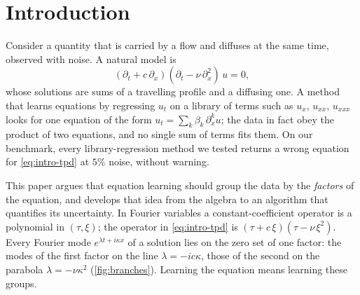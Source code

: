 \documentclass[11pt]{article}
\theoremstyle{plain}
\theoremstyle{definition}
\theoremstyle{remark}
\begin{document}
\section{Introduction}\label{sec:intro}
Consider a quantity that is carried by a flow and diffuses at the same time, observed with noise. A natural model is
\begin{equation}\label{eq:intro-tpd}
  (\partial_t+c\,\partial_x)(\partial_t-\nu\,\partial_x^2)\,u=0,
\end{equation}
whose solutions are sums of a travelling profile and a diffusing one. A method that learns equations by regressing
$u_t$ on a library of terms such as $u_x$, $u_{xx}$, $u_{xxx}$ looks for one equation of the form $u_t=\sum_k\beta_k\,\partial_x^ku$; the
data in fact obey the product of two equations, and no single sum of terms fits them. On our benchmark, every
library-regression method we tested returns a wrong equation for \eqref{eq:intro-tpd} at $5\%$ noise, without warning.

This paper argues that equation learning should group the data by the \emph{factors} of the equation, and develops that
idea from the algebra to an algorithm that quantifies its uncertainty. In Fourier variables a constant-coefficient operator
is a polynomial in $(\tau,\xi)$; the operator in \eqref{eq:intro-tpd} is $(\tau+c\,\xi)(\tau-\nu\,\xi^2)$. Every Fourier mode
$e^{\lambda t+i\kappa x}$ of a solution lies on the zero set of one factor: the modes of the first factor on the line
$\lambda=-ic\kappa$, those of the second on the parabola $\lambda=-\nu\kappa^2$ (\cref{fig:branches}). Learning the equation
means learning these groups.
\end{document}
